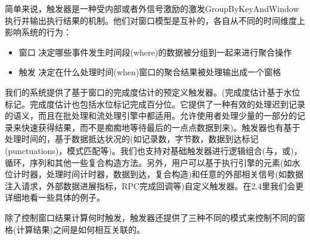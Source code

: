 \documentclass[oneside]{ctexbook}
\begin{document}
简单来说，触发器是一种受内部或者外信号激励的激发GroupByKeyAndWindow执行并输出执行结果的机制。他们对窗口模型是互补的，各自从不同的时间维度上影响系统的行为：

\begin{itemize}
\item 窗口 决定哪些事件发生时间段(where)的数据被分组到一起来进行聚合操作
\item 触发 决定在什么处理时间(when)窗口的聚合结果被处理输出成一个窗格
\end{itemize}
我们的系统提供了基于窗口的完成度估计的预定义触发器。(完成度估计基于水位标记。完成度估计也包括水位标记完成百分位。它提供了一种有效的处理迟到记录的语义，而且在批处理和流处理引擎中都适用。允许使用者处理少量的一部分的记录来快速获得结果，而不是痴痴地等待最后的一点点数据到来)。触发器也有基于处理时间的，基于数据抵达状况的(如记录数，字节数，数据到达标记(punctuations)，模式匹配等)。我们也支持对基础触发器进行逻辑组合(与，或)，循环，序列和其他一些复合构造方法。另外，用户可以基于执行引擎的元素(如水位计时器，处理时间计时器，数据到达，复合构造)和任意的外部相关信号(如数据注入请求，外部数据进展指标，RPC完成回调等)自定义触发器。在2.4里我们会更详细地看一些具体的例子。

除了控制窗口结果计算何时触发，触发器还提供了三种不同的模式来控制不同的窗格(计算结果)之间是如何相互关联的。
\end{document}
